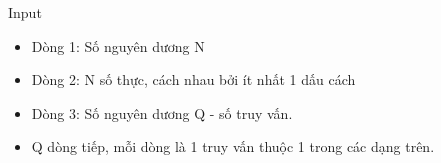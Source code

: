 Input  
\begin{itemize}
	\item     Dòng 1: Số nguyên dương N   
	\item     Dòng 2: N số thực, cách nhau bởi ít nhất 1 dấu cách   
	\item     Dòng 3: Số nguyên dương Q - số truy vấn.   
	\item     Q dòng tiếp, mỗi dòng là 1 truy vấn thuộc 1 trong các dạng trên.   
\end{itemize}